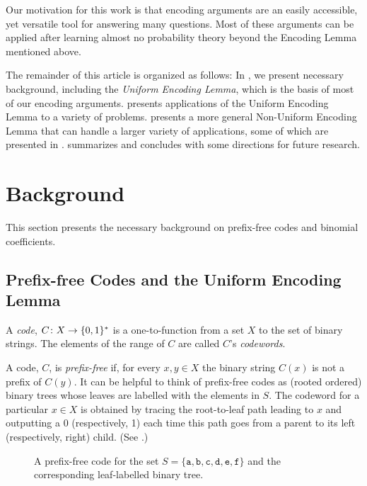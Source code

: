 \documentclass{patmorin}
\begin{document}
Our motivation for this work is that encoding arguments are an easily
accessible, yet versatile tool for answering many questions.  Most of
these arguments can be applied after learning almost no probability
theory beyond the Encoding Lemma mentioned above.

The remainder of this article is organized as follows: In ,
we present necessary background, including the \emph{Uniform
Encoding Lemma}, which is the basis of most of our encoding arguments.
 presents  applications of the Uniform Encoding
Lemma to a variety of problems.   presents a more
general Non-Uniform Encoding Lemma that can handle a larger variety of
applications, some of which are presented in .
 summarizes and concludes with some directions for
future research.



\section{Background}

This section presents the necessary background on prefix-free codes and binomial coefficients.

\subsection{Prefix-free Codes and the Uniform Encoding Lemma}

A \emph{code}, $C\colon X\to \{0,1\}^*$ is a one-to-function from a set
$X$ to the set of binary strings.  The elements of the range of $C$ are
called $C$'s \emph{codewords}.

A code, $C$, is \emph{prefix-free} if, for every $x,y\in X$ the binary
string $C(x)$ is not a prefix of $C(y)$.  It can be helpful to think
of prefix-free codes as (rooted ordered) binary trees whose leaves
are labelled with the elements in $S$.  The codeword for a particular
$x\in X$ is obtained by tracing the root-to-leaf path leading to $x$
and outputting a 0 (respectively, 1) each time this path goes from a
parent to its left (respectively, right) child. (See .)

\begin{figure}
  \caption{A prefix-free code for the set
    $S=\{\mathtt{a},\mathtt{b},\mathtt{c},\mathtt{d},\mathtt{e},\mathtt{f}\}$
    and the corresponding leaf-labelled binary tree.}
\end{figure}
\end{document}
